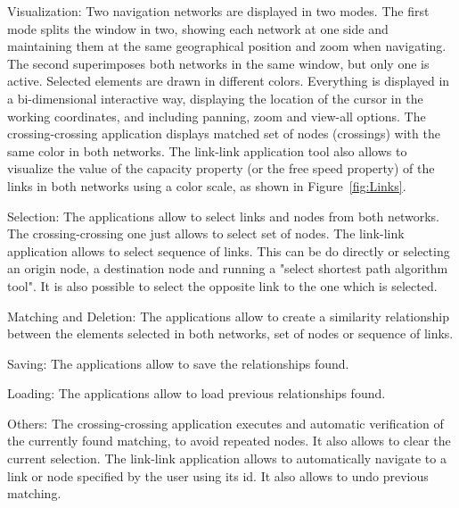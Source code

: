 \begin{compactitem}
\item Visualization: Two navigation networks are displayed in two modes. The first mode splits the window in two, showing each network at one side and maintaining them at the same geographical position and zoom when navigating. The second superimposes both networks in the same window, but only one is active. Selected elements are drawn in different colors. Everything is displayed in a bi-dimensional interactive way, displaying the location of the cursor in the working coordinates, and including panning, zoom and view-all options. The crossing-crossing application displays matched set of nodes (crossings) with the same color in both networks. The link-link application tool also allows to visualize the value of the capacity property (or the free speed property) of the links in both networks using a color scale, as shown in Figure~\ref{fig:Links}.
\item Selection: The applications allow to select links and nodes from both networks. The crossing-crossing one just allows to select set of nodes. The link-link application allows to select sequence of links. This can be do directly or selecting an origin node, a destination node and running a "select shortest path algorithm tool". It is also possible to select the opposite link to the one which is selected.
\item Matching and Deletion: The applications allow to create a similarity relationship between the elements selected in both networks, set of nodes or sequence of links.
\item Saving: The applications allow to save the relationships found.
\item Loading: The applications allow to load previous relationships found.
\item Others: The crossing-crossing application executes and automatic verification of the currently found matching, to avoid repeated nodes. It also allows to clear the current selection. The link-link application allows to automatically navigate to a link or node specified by the user using its id. It also allows to undo previous matching. 
\end{compactitem}

